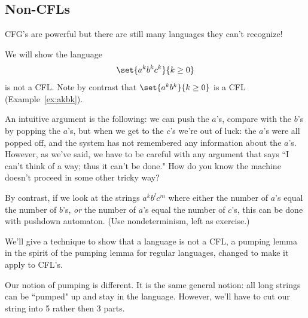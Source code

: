 \subsection{Non-CFLs}
CFG's are powerful but there are still many languages they can't recognize!

We will show the language
\[
\set{a^kb^kc^k}{k\ge 0}
\]
is not a CFL. Note by contrast that $\set{a^kb^k}{k\ge 0}$ is a CFL (Example~\ref{ex:akbk}).

An intuitive argument is the following: we can push the $a$'s, compare with the $b$'s by popping the $a$'s, but when we get to the $c$'s we're out of luck: the $a$'s were all popped off, and the system has not remembered any information about the $a$'s. However, as we've said, we have to be careful with any argument that says ``I can't think of a way; thus it can't be done." How do you know the machine doesn't proceed in some other tricky way?

By contrast, if we look at the strings $a^kb^lc^m$ where either the number of $a$'s equal the number of $b$'s, {\it or} the number of $a$'s equal the number of $c$'s, this can be done with pushdown automaton. (Use nondeterminism, left as exercise.)

We'll give a technique to show that a language is not a CFL, a pumping lemma in the spirit of the pumping lemma for regular languages, changed to make it apply to CFL's.

Our notion of pumping is different. It is the same general notion: all long strings can be ``pumped" up and stay in the language. However, we'll have to cut our string into 5 rather then 3 parts.

